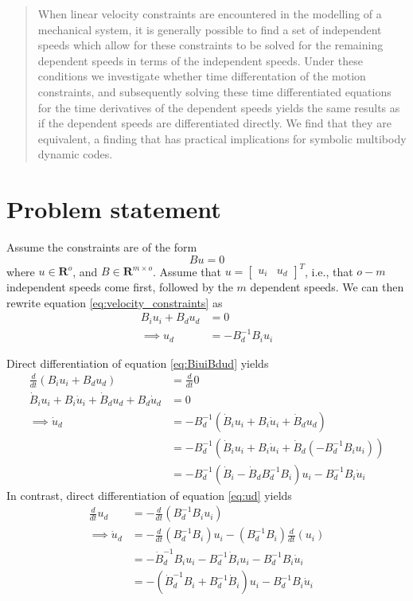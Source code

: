 \documentclass[letterpaper,11pt]{article}
\begin{document}
\begin{abstract}
  When linear velocity constraints are encountered in the modelling of a
  mechanical system, it is generally possible to find a set of independent
  speeds which allow for these constraints to be solved for the remaining
  dependent speeds in terms of the independent speeds.  Under these conditions
  we investigate whether time differentation of the motion constraints, and
  subsequently solving these time differentiated equations for the time
  derivatives of the dependent speeds yields the same results as if the
  dependent speeds are differentiated directly.  We find that they are equivalent, a finding that has practical implications for symbolic multibody
  dynamic codes.
\end{abstract}

\section{Problem statement}
Assume the constraints are of the form
\begin{equation}
  \label{eq:velocity_constraints}
  B u = 0
\end{equation}
where $u\in\mathbf{R}^o$, and $B \in \mathbf{R}^{m \times o}$.  Assume that $u
= \left[\begin{array}{cc}u_i & u_d\end{array}\right]^{T}$, i.e., that $o-m$
  independent speeds come first, followed by the $m$ dependent speeds.  We can
  then rewrite equation \ref{eq:velocity_constraints} as
\begin{align}
  \label{eq:BiuiBdud}
  B_i u_i + B_d u_d &= 0 \\
  \label{eq:ud}
  \implies u_d &= -B_d^{-1} B_i u_i
\end{align}

Direct differentiation of equation \ref{eq:BiuiBdud} yields
\begin{align}
  \frac{d}{dt} \left(B_i u_i + B_d u_d \right) &= \frac{d}{dt} 0 \\
  \dot{B}_i u_i + B_i \dot{u}_i + \dot{B}_d u_d + B_d \dot{u}_d &= 0 \\
  \implies \dot{u}_d &= -B_d^{-1} \left(\dot{B}_i u_i + B_i \dot{u}_i + \dot{B}_d u_d \right)\\
  &= -B_d^{-1} \left(\dot{B}_i u_i + B_i \dot{u}_i+ \dot{B}_d \left(-B_d^{-1} B_i u_i \right) 
  \right) \\
  &= -B_d^{-1} \left( \dot{B}_i - \dot{B}_d B_d^{-1} B_i \right) u_i - B_d^{-1}
  B_i \dot{u}_i
\end{align}
In contrast, direct differentiation of equation \ref{eq:ud} yields
\begin{align}
  \frac{d}{dt} u_d &= -\frac{d}{dt}\left(B_d^{-1} B_i u_i\right)\\
\implies  \dot{u}_d &= -\frac{d}{dt}\left(B_d^{-1} B_i \right) u_i -
  \left(B_d^{-1} B_i \right) \frac{d}{dt}\left(u_i\right)\\
  &= -\dot{B}_d^{-1} B_i u_i - B_d^{-1} \dot{B}_i u_i
                    - B_d^{-1} B_i \dot{u}_i \\
  &= -\left(\dot{B}_d^{-1} B_i + B_d^{-1} \dot{B}_i\right) u_i - B_d^{-1} B_i \dot{u}_i
\end{align}
\end{document}
